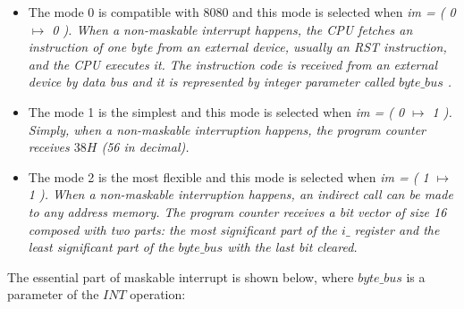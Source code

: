 \documentclass[a4paper]{llncs}
\begin{document}
 \begin{itemize}
   
  \item The mode 0 is compatible with 8080 and this mode is selected when \it im \rm = \rm ( \rm 0 $\mapsto$  \rm 0 \rm ). When a 
  non-maskable interrupt happens, the CPU fetches an instruction of one byte
  from an external device, usually an RST instruction, and the CPU executes it.
  The instruction code is received from an external device by data bus and it is represented by integer parameter called $\textit{byte\_bus}$ .

 
  \item The mode 1 is the simplest and this mode is selected when \it im \rm = \rm ( \rm 0  $\mapsto$  \rm 1
  \rm ). Simply, when a non-maskable interruption happens, the program counter
  receives $38H$ (56 in decimal).
  
  \item The mode 2 is the most flexible and this mode is selected when \it im \rm = \rm ( \rm 1  $\mapsto$
  \rm 1 \rm ). When a non-maskable interruption happens, an indirect call can be
  made to any address memory. The program counter receives a bit vector of size
  16 composed with two parts: the most significant part of the $\textit{i\_}$
  register and the least significant part of the $\textit{byte\_bus}$ with the
  last bit cleared.
  
 \end{itemize}

The essential part of maskable interrupt is shown below, where $\textit{byte\_bus}$ is a parameter of the $\textit{INT}$ operation:
 
\end{document}
